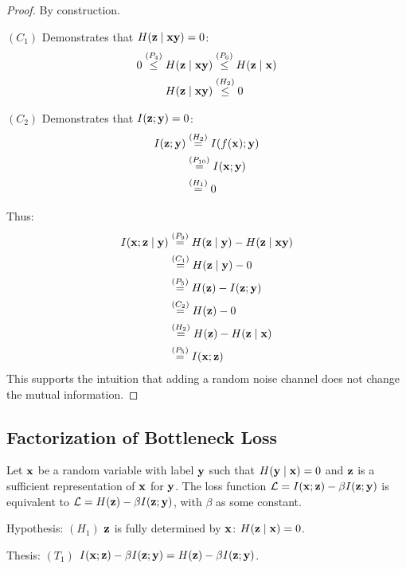 \begin{proof}
By construction.

$(C_1)$ Demonstrates that $H({\mathbf{z}} \mid {\mathbf{x}} {\mathbf{y}}) = 0$:
\begin{align*} 0 \stackrel{\left(P_4\right)}{\leq} H({\mathbf{z}} \mid {\mathbf{x}} {\mathbf{y}}) &\stackrel{\left(P_6\right)}{\leq} H({\mathbf{z}} \mid {\mathbf{x}}) \\ H({\mathbf{z}} \mid {\mathbf{x}} {\mathbf{y}}) &\stackrel{\left(H_2\right)}{\leq} 0 \end{align*}

$(C_2)$ Demonstrates that $I({\mathbf{z}};{\mathbf{y}}) = 0$:
\begin{align*} I({\mathbf{z}}; {\mathbf{y}}) &\stackrel{\left(H_2\right)}{=} I(f({\mathbf{x}});{\mathbf{y}}) \\ &\stackrel{\left(P_{10}\right)}{=} I({\mathbf{x}} ; {\mathbf{y}}) \\ &\stackrel{\left(H_{1}\right)}{=} 0 \end{align*}

Thus:
\begin{align*} I({\mathbf{x}}; {\mathbf{z}} \mid {\mathbf{y}}) &\stackrel{\left(P_9\right)}{=} H({\mathbf{z}} \mid {\mathbf{y}}) - H({\mathbf{z}} \mid {\mathbf{x}} {\mathbf{y}}) \\ &\stackrel{\left(C_1\right)}{=} H({\mathbf{z}} \mid {\mathbf{y}}) - 0 \\ &\stackrel{\left(P_5\right)}{=} H({\mathbf{z}}) - I({\mathbf{z}}; {\mathbf{y}}) \\ &\stackrel{\left(C_2\right)}{=} H({\mathbf{z}}) - 0 \\ &\stackrel{\left(H_2\right)}{=} H({\mathbf{z}}) - H({\mathbf{z}} \mid {\mathbf{x}}) \\ &\stackrel{\left(P_5\right)}{=} I({\mathbf{x}}; {\mathbf{z}}) \end{align*}
This supports the intuition that adding a random noise channel does not change the mutual information.
\end{proof}

\subsection{Factorization of Bottleneck Loss}
\label{app:lossfact}

\begin{lemma}
Let ${\mathbf{x}}$ be a random variable with label ${\mathbf{y}}$ such that $H({\mathbf{y}} \mid {\mathbf{x}}) = 0$ and ${\mathbf{z}}$ is a sufficient representation of ${\mathbf{x}}$ for ${\mathbf{y}}$. The loss function $\mathcal{L}=I({\mathbf{x}}; {\mathbf{z}})-\beta I({\mathbf{z}}; {\mathbf{y}})$ is equivalent to $\mathcal{L}=H({\mathbf{z}})-\beta I({\mathbf{z}}; {\mathbf{y}})$, with $\beta$ as some constant.

Hypothesis: $(H_1)$ ${\mathbf{z}}$ is fully determined by ${\mathbf{x}}$: $H({\mathbf{z}} \mid {\mathbf{x}}) = 0$.

Thesis: $(T_1)$ $I({\mathbf{x}}; {\mathbf{z}})-\beta I({\mathbf{z}}; {\mathbf{y}}) = H({\mathbf{z}})-\beta I({\mathbf{z}}; {\mathbf{y}})$.
\label{lossfact}
\end{lemma}


